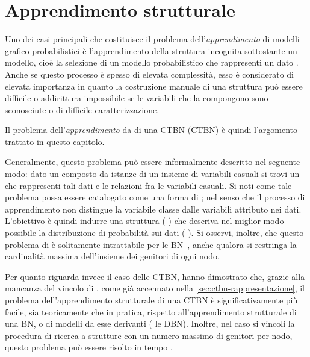 
\chapter{Apprendimento strutturale}
\label{cap:structurallearning}
Uno dei casi principali che costituisce il problema dell'\emph{apprendimento} di modelli grafico probabilistici è l'apprendimento della struttura incognita sottostante un modello, cioè la selezione di un modello probabilistico che rappresenti un dato \emph{\keyword{\trs{}}}. Anche se questo processo è spesso di elevata complessità, esso è considerato di elevata importanza in quanto la costruzione manuale di una struttura può essere difficile o addirittura impossibile se le variabili che la compongono sono sconosciute o di difficile caratterizzazione.

Il problema dell'\emph{apprendimento } da \emph{} di una \acl{CTBN} (\acs{CTBN}) è quindi l'argomento trattato in questo capitolo.

Generalmente, questo problema può essere informalmente descritto nel seguente modo: dato un \emph{\keyword{\trs{}}} composto da istanze di un insieme di variabili casuali si trovi un  che rappresenti tali dati e le relazioni fra le variabili casuali. Si noti come tale problema possa essere catalogato come una forma di ; nel senso che il processo di apprendimento non distingue la variabile classe dalle variabili attributo nei dati. L'obiettivo è quindi indurre una struttura (\ie{} ) che descriva nel miglior modo possibile la distribuzione di probabilità sui dati (\ie{} \emph{\keyword{\trs{}}}). Si osservi, inoltre, che questo problema di  è solitamente intrattabile per le \acl{BN}~\citep{Chickering1994,Chickering2004}, anche qualora si restringa la cardinalità massima dell'insieme dei genitori di ogni nodo.

Per quanto riguarda invece il caso delle \acs{CTBN}, \citet{Nodelman2002} hanno dimostrato che, grazie alla mancanza del vincolo di , come già accennato nella \autoref{sec:ctbn-rappresentazione}, il problema dell'apprendimento strutturale di una \acs{CTBN} è significativamente più facile, sia teoricamente che in pratica, rispetto all'apprendimento strutturale di una \acl{BN}, o di modelli da esse derivanti (\eg{} le \acf{DBN}). Inoltre, nel caso si vincoli la procedura di ricerca a strutture con un numero massimo di genitori per nodo, questo problema può essere risolto in tempo .


